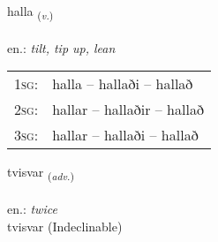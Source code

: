 \documentclass[frontgrid, backgrid]{flacards}\usepackage[]{graphicx}\usepackage[]{xcolor}
\begin{document}
\renewcommand{\flhead}{\vskip5pt \fboxsep=0pt {\small\bfseries\footnotesize Sagnorð | Verb}}
\renewcommand{\fcfoot}{\vskip5pt \fboxsep=0pt \hspace{2pt}{\small\bfseries\footnotesize 2K}}

\renewcommand{\blhead}{\vskip5pt {\small\bfseries\footnotesize Sagnorð | Verb }}
\renewcommand{\bcfoot}{\vskip5pt \hspace{2pt}{\small\bfseries\footnotesize 2K}}


{halla \small{\textsubscript{(\textit{v.})}} \\[1ex] %
\textphonetic{[hatla]} \\
en.: \emph{tilt, tip up, lean} \\  [2ex]
\renewcommand*{\arraystretch}{0.8}
\begin{tabular}{p{1cm}l}
\textsc{1sg}: & halla -- hallaði -- hallað \\ 
\textsc{2sg}: & hallar -- hallaðir -- hallað \\ 
\textsc{3sg}: & hallar -- hallaði -- hallað \\ 
\end{tabular}
}


\renewcommand{\flhead}{\vskip5pt \fboxsep=0pt {\small\bfseries\footnotesize Atviksorð | Adverb}}
\renewcommand{\fcfoot}{\vskip5pt \fboxsep=0pt \hspace{2pt}{\small\bfseries\footnotesize 2K}}

\renewcommand{\blhead}{\vskip5pt {\small\bfseries\footnotesize Atviksorð | Adverb }}
\renewcommand{\bcfoot}{\vskip5pt \hspace{2pt}{\small\bfseries\footnotesize 2K}}


{tvisvar \small{\textsubscript{(\textit{adv.})}} \\[1ex]
\textphonetic{[tʰvɪːsvar]} \\
en.: \emph{twice} \\  [2ex]
tvisvar (Indeclinable)}
\end{document}

